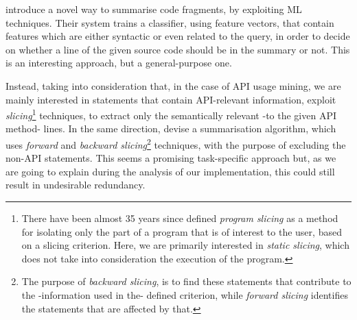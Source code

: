  \cite{Ying:2013} introduce a novel way to summarise code fragments, by exploiting ML techniques. Their system trains a classifier, using feature vectors, that contain features which are either syntactic or even related to the query, in order to decide on whether a line of the given source code should be in the summary or not. This is an interesting approach, but a general-purpose one.

Instead, taking into consideration that, in the case of API usage mining, we are mainly interested in statements that contain API-relevant information,  \cite{Kim:2013} exploit \textit{slicing}\footnote{There have been almost 35 years since  \cite{Weiser:1981} defined \textit{program slicing} as a method for isolating only the part of a program that is of interest to the user, based on a slicing criterion. Here, we are primarily interested in \textit{static slicing}, which does not take into consideration the execution of the program.} techniques, to extract only the semantically relevant -to the given API method- lines. In the same direction,  \cite{Montandon:2013} devise a summarisation algorithm, which uses \textit{forward} and \textit{backward slicing}\footnote{The purpose of \textit{backward slicing}, is to find these statements that contribute to the -information used in the- defined  criterion, while \textit{forward slicing} identifies the statements that are affected by that.} techniques, with the purpose of excluding the non-API statements. This seems a promising task-specific approach but, as we are going to explain during the analysis of our implementation, this could still result in undesirable redundancy.